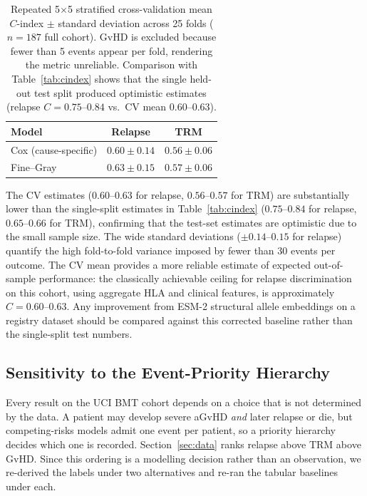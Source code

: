 \documentclass[11pt,a4paper]{article}
\begin{document}
\begin{table}[t!]
  \caption{Repeated 5$\times$5 stratified cross-validation mean $C$-index
    $\pm$ standard deviation across 25 folds ($n=187$ full cohort).
    GvHD is excluded because fewer than 5 events appear per fold,
    rendering the metric unreliable.
    Comparison with Table~\ref{tab:cindex} shows that the single held-out test
    split produced optimistic estimates (relapse $C = 0.75$--$0.84$ vs.\
    CV mean $0.60$--$0.63$).}
  \label{tab:cv}
  \begin{tabular}{lcc}
    \toprule
    \textbf{Model} & \textbf{Relapse} & \textbf{TRM} \\
    \midrule
    Cox (cause-specific) & $0.60 \pm 0.14$ & $0.56 \pm 0.06$ \\
    Fine--Gray           & $0.63 \pm 0.15$ & $0.57 \pm 0.06$ \\
    \bottomrule
  \end{tabular}
\end{table}

The CV estimates ($0.60$--$0.63$ for relapse, $0.56$--$0.57$ for TRM) are
substantially lower than the single-split estimates in Table~\ref{tab:cindex}
($0.75$--$0.84$ for relapse, $0.65$--$0.66$ for TRM), confirming that the
test-set estimates are optimistic due to the small sample size.  The wide
standard deviations ($\pm 0.14$--$0.15$ for relapse) quantify the high
fold-to-fold variance imposed by fewer than 30 events per outcome.  The CV
mean provides a more reliable estimate of expected out-of-sample performance:
the classically achievable ceiling for relapse discrimination on this cohort,
using aggregate HLA and clinical features, is approximately $C = 0.60$--$0.63$.
Any improvement from ESM-2 structural allele embeddings on a registry dataset
should be compared against this corrected baseline rather than the
single-split test numbers.

\subsection{Sensitivity to the Event-Priority Hierarchy}
\label{sec:hierarchy}

Every result on the UCI BMT cohort depends on a choice that is not determined
by the data.  A patient may develop severe aGvHD \emph{and} later relapse or
die, but competing-risks models admit one event per patient, so a priority
hierarchy decides which one is recorded.  Section~\ref{sec:data} ranks
relapse above TRM above GvHD.  Since this ordering is a modelling decision
rather than an observation, we re-derived the labels under two alternatives
and re-ran the tabular baselines under each.
\end{document}
